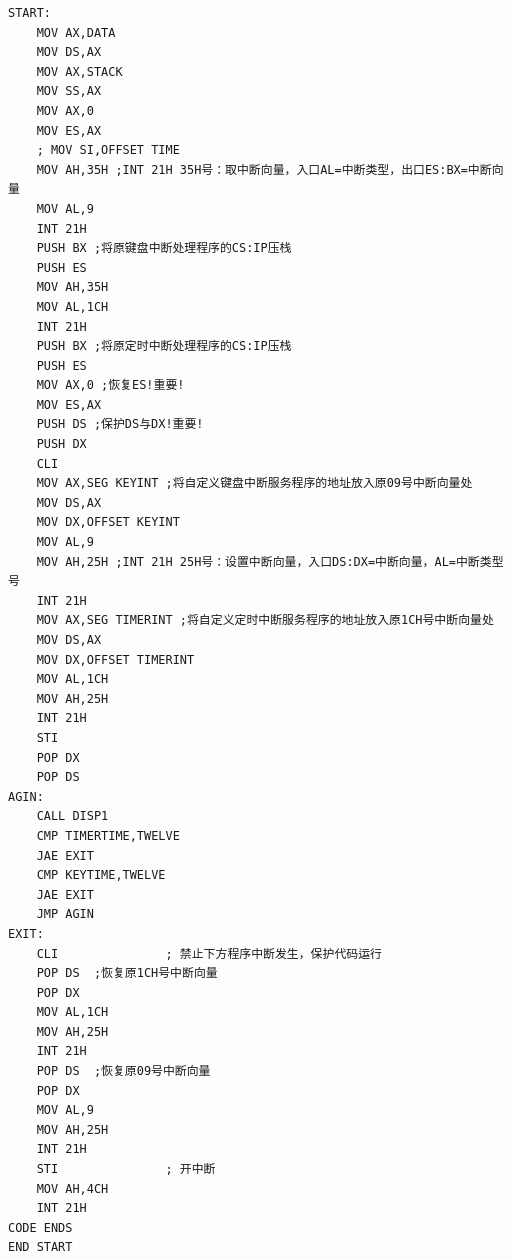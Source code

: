 \documentclass[12pt, a4paper, oneside]{ctexart}
\begin{document}
\begin{lstlisting}
START:
    MOV AX,DATA 
    MOV DS,AX 
    MOV AX,STACK
    MOV SS,AX
    MOV AX,0
    MOV ES,AX
    ; MOV SI,OFFSET TIME
    MOV AH,35H ;INT 21H 35H号：取中断向量，入口AL=中断类型，出口ES:BX=中断向量
    MOV AL,9
    INT 21H 
    PUSH BX ;将原键盘中断处理程序的CS:IP压栈
    PUSH ES 
    MOV AH,35H 
    MOV AL,1CH
    INT 21H 
    PUSH BX ;将原定时中断处理程序的CS:IP压栈
    PUSH ES
    MOV AX,0 ;恢复ES!重要!
    MOV ES,AX
    PUSH DS ;保护DS与DX!重要!
    PUSH DX
    CLI
    MOV AX,SEG KEYINT ;将自定义键盘中断服务程序的地址放入原09号中断向量处
    MOV DS,AX
    MOV DX,OFFSET KEYINT
    MOV AL,9
    MOV AH,25H ;INT 21H 25H号：设置中断向量，入口DS:DX=中断向量，AL=中断类型号
    INT 21H
    MOV AX,SEG TIMERINT ;将自定义定时中断服务程序的地址放入原1CH号中断向量处
    MOV DS,AX
    MOV DX,OFFSET TIMERINT
    MOV AL,1CH
    MOV AH,25H 
    INT 21H
    STI
    POP DX 
    POP DS 
AGIN:
    CALL DISP1
    CMP TIMERTIME,TWELVE
    JAE EXIT
    CMP KEYTIME,TWELVE
    JAE EXIT 
    JMP AGIN
EXIT:
    CLI               ; 禁止下方程序中断发生，保护代码运行
    POP DS  ;恢复原1CH号中断向量
    POP DX
    MOV AL,1CH
    MOV AH,25H
    INT 21H
    POP DS  ;恢复原09号中断向量
    POP DX
    MOV AL,9
    MOV AH,25H
    INT 21H
    STI               ; 开中断
    MOV AH,4CH
    INT 21H
CODE ENDS
END START 
\end{lstlisting}
\end{document}
